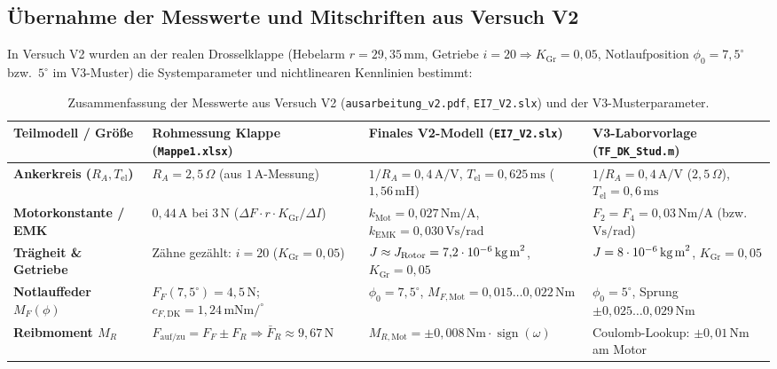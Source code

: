 \documentclass[a4paper,10pt,department=FakEI]{OTHRartcl}
\begin{document}
\subsection{Übernahme der Messwerte und Mitschriften aus Versuch V2}
In Versuch V2 wurden an der realen Drosselklappe (Hebelarm $r = 29{,}35\,\text{mm}$, Getriebe $i = 20 \Rightarrow K_{\text{Gr}} = 0{,}05$, Notlaufposition $\phi_0 = 7{,}5^\circ$ bzw.\ $5^\circ$ im V3-Muster) die Systemparameter und nichtlinearen Kennlinien bestimmt:
\begin{table}[H]
\centering
\scriptsize
\caption{Zusammenfassung der Messwerte aus Versuch V2 (\texttt{ausarbeitung\_v2.pdf}, \texttt{EI7\_V2.slx}) und der V3-Musterparameter.}
\label{tab:v2_parameter}
\begin{tabular*}{\textwidth}{@{\extracolsep{\fill}}llll@{}}
\toprule
\textbf{Teilmodell / Größe} & \textbf{Rohmessung Klappe (\texttt{Mappe1.xlsx})} & \textbf{Finales V2-Modell (\texttt{EI7\_V2.slx})} & \textbf{V3-Laborvorlage (\texttt{TF\_DK\_Stud.m})} \\
\midrule
\textbf{Ankerkreis ($R_A, T_{\text{el}}$)} & $R_A = 2{,}5\,\Omega$ (aus $1\,\text{A}$-Messung) & $1/R_A = 0{,}4\,\text{A/V}$, $T_{\text{el}} = 0{,}625\,\text{ms}$ ($1{,}56\,\text{mH}$) & $1/R_A = 0{,}4\,\text{A/V}$ ($2{,}5\,\Omega$), $T_{\text{el}} = 0{,}6\,\text{ms}$ \\
\textbf{Motorkonstante / EMK} & $0{,}44\,\text{A}$ bei $3\,\text{N}$ ($\Delta F\cdot r\cdot K_{\text{Gr}}/\Delta I$) & $k_{\text{Mot}} = 0{,}027\,\text{Nm/A}$, $k_{\text{EMK}} = 0{,}030\,\text{Vs/rad}$ & $F_2 = F_4 = 0{,}03\,\text{Nm/A}$ (bzw.\ $\text{Vs/rad}$) \\
\textbf{Trägheit \& Getriebe} & Zähne gezählt: $i = 20$ ($K_{\text{Gr}} = 0{,}05$) & $J \approx J_{\text{Rotor}} = 7{,}2\cdot 10^{-6}\,\text{kg\,m}^2$, $K_{\text{Gr}} = 0{,}05$ & $J = 8\cdot 10^{-6}\,\text{kg\,m}^2$, $K_{\text{Gr}} = 0{,}05$ \\
\textbf{Notlauffeder $M_F(\phi)$} & $F_F(7{,}5^\circ)=4{,}5\,\text{N}$; $c_{F,\text{DK}} = 1{,}24\,\text{mNm/}^\circ$ & $\phi_0 = 7{,}5^\circ$, $M_{F,\text{Mot}} = 0{,}015\dots 0{,}022\,\text{Nm}$ & $\phi_0 = 5^\circ$, Sprung $\pm 0{,}025\dots 0{,}029\,\text{Nm}$ \\
\textbf{Reibmoment $M_R$} & $F_{\text{auf/zu}} = F_F \pm F_R \Rightarrow \bar{F}_R \approx 9{,}67\,\text{N}$ & $M_{R,\text{Mot}} = \pm 0{,}008\,\text{Nm}\cdot\operatorname{sign}(\omega)$ & Coulomb-Lookup: $\pm 0{,}01\,\text{Nm}$ am Motor \\
\bottomrule
\end{tabular*}
\end{table}
\end{document}
